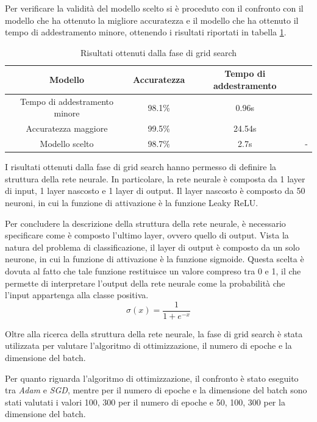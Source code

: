 Per verificare la validità del modello scelto si è proceduto con il confronto con 
il modello che ha ottenuto la migliore accuratezza e il modello che ha ottenuto
il tempo di addestramento minore, ottenendo i risultati riportati in tabella \ref{tab:ris-grid-search}.
\begin{table}[ht]
    \centering
    \begin{tabular}{|c|c|c|c|}
        \hline
        \textbf{Modello} & \textbf{Accuratezza} & \textbf{Tempo di addestramento}\\
        \hline
        Tempo di addestramento minore & 98.1\% & 0.96s\\
        \hline
        Accuratezza maggiore & 99.5\% & 24.54s \\
        \hline
        Modello scelto & 98.7\% & 2.7s & - \\
        \hline
    \end{tabular}
    \caption{Risultati ottenuti dalla fase di grid search}
    \label{tab:ris-grid-search}
\end{table}

I risultati ottenuti dalla fase di grid search hanno permesso di definire la
struttura della rete neurale. In particolare, la rete neurale è composta da 1 
layer di input, 1 layer nascosto e 1 layer di output. Il layer nascosto è composto
da 50 neuroni, in cui la funzione di attivazione è la funzione Leaky ReLU. 

Per concludere la descrizione della struttura della rete neurale, è necessario
specificare come è composto l'ultimo layer, ovvero quello di output. Vista la  
natura del problema di classificazione, il layer di output è composto da un solo
neurone, in cui la funzione di attivazione è la funzione sigmoide. Questa scelta
è dovuta al fatto che tale funzione restituisce un valore compreso tra 0
e 1, il che permette di interpretare l'output della rete neurale come la
probabilità che l'input appartenga alla classe positiva.
\begin{equation}
    \sigma(x) = \frac{1}{1 + e^{-x}}
\end{equation}

Oltre alla ricerca della struttura della rete neurale, la fase di grid search è 
stata utilizzata per valutare l'algoritmo di ottimizzazione, il numero di epoche
e la dimensione del batch.

Per quanto riguarda l'algoritmo di ottimizzazione, il confronto è stato eseguito
tra \textit{Adam} e \textit{SGD}, mentre per il numero di epoche e la dimensione
del batch sono stati valutati i valori 100, 300 per il numero di epoche e 50,
100, 300 per la dimensione del batch.

